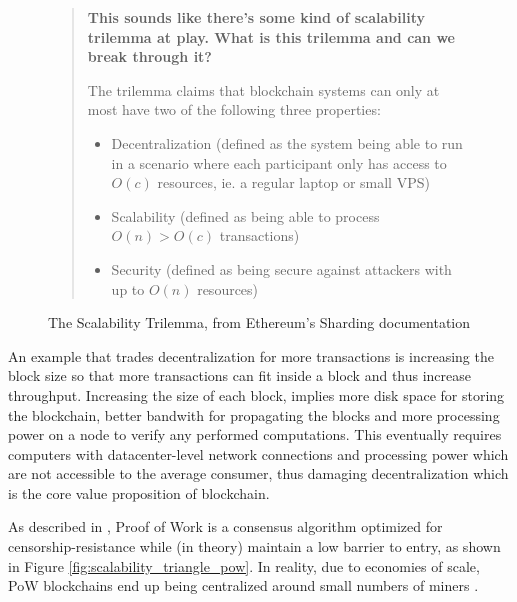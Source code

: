 \begin{figure}[H]
\begin{quote}
    \textbf{This sounds like there’s some kind of scalability trilemma at play. What is this trilemma and can we break through it?}

    The trilemma claims that blockchain systems can only at most have two of the following three properties:

    \begin{itemize}
        \item Decentralization (defined as the system being able to run in a scenario where each participant only has access to $O(c)$ resources, ie. a regular laptop or small VPS)
        \item Scalability (defined as being able to process $O(n) > O(c)$ transactions)
        \item Security (defined as being secure against attackers with up to $O(n)$ resources)
    \end{itemize}
\end{quote}
\label{fig:trilemma}
\caption{The Scalability Trilemma, from Ethereum's Sharding documentation \cite{sharding}}
\end{figure}

An example that trades decentralization for more transactions is increasing the block size so that more transactions can fit inside a block and thus increase throughput. Increasing the size of each block, implies more disk space for storing the blockchain, better bandwith for propagating the blocks and more processing power on a node to verify any performed computations. This eventually requires computers with datacenter-level network connections and processing power which are not accessible to the average consumer, thus damaging decentralization which is the core value proposition of blockchain. %

As described in \cite{scaling-trustless-models}, Proof of Work is a consensus algorithm optimized for censorship-resistance while (in theory) maintain a low barrier to entry, as shown in Figure \ref{fig:scalability_triangle_pow}. In reality, due to economies of scale, PoW blockchains end up being centralized around small numbers of miners \cite{Gencer2018DecentralizationIB}. 

